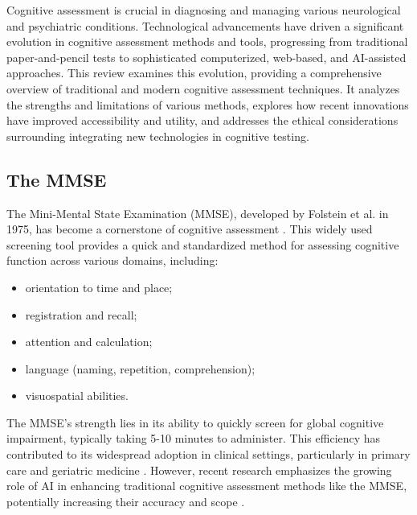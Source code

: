 Cognitive assessment is crucial in diagnosing and managing various neurological and psychiatric conditions. Technological advancements have driven a significant evolution in cognitive assessment methods and tools, progressing from traditional paper-and-pencil tests to sophisticated computerized, web-based, and AI-assisted approaches. This review examines this evolution, providing a comprehensive overview of traditional and modern cognitive assessment techniques. It analyzes the strengths and limitations of various methods, explores how recent innovations have improved accessibility and utility, and addresses the ethical considerations surrounding integrating new technologies in cognitive testing.

\subsection{The MMSE}
The Mini-Mental State Examination (MMSE), developed by Folstein et al. in 1975, has become a cornerstone of cognitive assessment \cite{Folstein1975}. This widely used screening tool provides a quick and standardized method for assessing cognitive function across various domains, including:
\begin{itemize}
\item orientation to time and place;
\item registration and recall;
\item attention and calculation;
\item language (naming, repetition, comprehension);
\item visuospatial abilities.
\end{itemize}

The MMSE's strength lies in its ability to quickly screen for global cognitive impairment, typically taking 5-10 minutes to administer. This efficiency has contributed to its widespread adoption in clinical settings, particularly in primary care and geriatric medicine \cite{Crum1993}. However, recent research emphasizes the growing role of AI in enhancing traditional cognitive assessment methods like the MMSE, potentially increasing their accuracy and scope \cite{Veneziani2024}.

